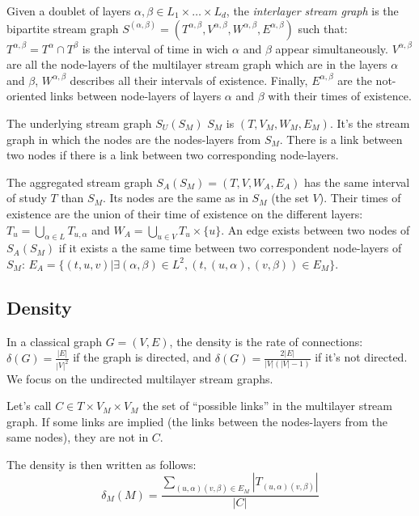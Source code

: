 \documentclass{svproc}
\begin{document}
	
	\begin{definition}		
	Given a doublet of layers $\alpha, \beta \in L_1\times \dots\times L_d$, the {\em interlayer stream graph} is the bipartite stream graph $S^{(\alpha,\beta)} = (T^{\alpha,\beta}, V^{\alpha,\beta},W^{\alpha,\beta},E^{\alpha,\beta})$ such that: $T^{\alpha,\beta}=T^{\alpha}\cap T^{\beta}$ is the interval of time in wich $\alpha$ and $\beta$ appear simultaneously. $V^{\alpha,\beta}$ are all the node-layers of the multilayer stream graph which are in the layers $\alpha$ and $\beta$, $W^{\alpha,\beta}$ describes all their intervals of existence. Finally, $E^{\alpha,\beta}$ are the not-oriented links between node-layers of layers $\alpha$ and $\beta$ with their times of existence.
	\end{definition}
	
\begin{definition}
	The underlying stream graph $S_U(S_M)$ $S_M$ is  $(T,V_M,W_M,E_M)$. It's the stream graph in which the nodes are the nodes-layers from $S_M$. There is a link between two nodes if there is a link between two corresponding node-layers.
\end{definition}
	
	\begin{definition}
		
		The aggregated stream graph $S_A(S_M)=(T,V,W_A,E_A)$ has the same interval of study $T$ than $S_M$. Its nodes are the same as in $S_M$ (the set $V$). Their times of existence are the union of their time of existence on the different layers: $T_u = \bigcup_{\alpha \in L} T_{u,\alpha}$ and $W_A=\bigcup_{u\in V} T_u\times\{u\}$. An edge exists between two nodes of $S_A(S_M)$ if it exists a the same time between two correspondent node-layers of $S_M$:  $E_A = \{(t,u,v)| \exists (\alpha,\beta) \in L^2, (t,(u,\alpha),(v,\beta)) \in E_M \}$.
	\end{definition}

\subsection{Density}
%
In a classical graph $G=(V,E)$, the density is the rate of connections: $\delta(G)= \frac{|E|}{|V|^2}$ if the graph is directed, and  $\delta(G)= \frac{2|E|}{|V|(|V|-1)}$ if it's not directed. We focus on the undirected multilayer stream graphs.

\begin{definition}	Let's call $C \in T \times V_M\times V_M$ the set of ``possible links'' in the multilayer stream graph. If some links are implied (the links between the nodes-layers from the same nodes), they are not in $C$. 
	
	The density is then written as follows:
	\[
		\delta_M (M) 
		= \frac{\sum_{(u,\alpha)(v,\beta) \in E_M}|T_{(u,\alpha)(v,\beta)}|}{|C|}
	\]
\end{definition}	
	
\end{document}
